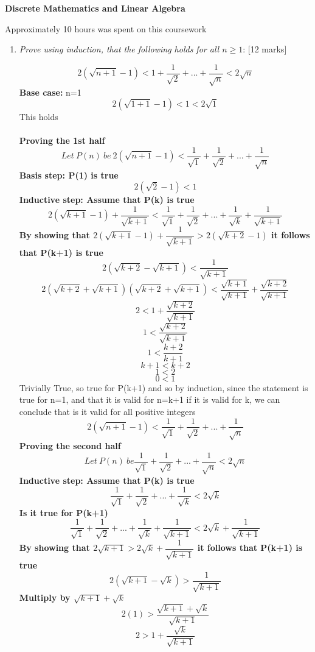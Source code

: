 \documentclass{article}[18pt]
\begin{document}
\begin{center}
\textbf{\Large Discrete Mathematics and Linear Algebra}
\end{center}
Approximately 10 hours was spent on this coursework
\begin{enumerate}
	\item \textit{Prove \textit{using induction}, that the following holds for all $n\geqslant 1$}:\hfill
[12 marks]

	$$2(\sqrt{n+1}-1)<1+\dfrac{1}{\sqrt{2}}+...+\dfrac{1}{\sqrt{n}}<2\sqrt{n}$$
	$ $\\
	\textbf{Base case:} n=1 
	$$2(\sqrt{1+1}-1)<1<2\sqrt{1}$$
	This holds\\
\\
\textbf{Proving the 1st half \cite{rosen}}\\
$$ Let \ P(n) \ be \  2(\sqrt{n+1}-1)<\dfrac{1}{\sqrt{1}}+\dfrac{1}{\sqrt{2}}+...+\dfrac{1}{\sqrt{n}}$$
\textbf{Basis step: P(1) is true}
$$2(\sqrt{2}-1)<1$$
\textbf{Inductive step: Assume that P(k) is true}
$$2(\sqrt{k+1}-1)+\dfrac{1}{\sqrt{k+1}}<\dfrac{1}{\sqrt{1}}+\dfrac{1}{\sqrt{2}}+...+\dfrac{1}{\sqrt{k}}+\dfrac{1}{\sqrt{k+1}}$$
\textbf{By showing that $2(\sqrt{k+1}-1)+\dfrac{1}{\sqrt{k+1}}>2(\sqrt{k+2}-1)$ it follows that P(k+1) is true}
$$2(\sqrt{k+2}-\sqrt{k+1})<\dfrac{1}{\sqrt{k+1}}$$
$$2(\sqrt{k+2}+\sqrt{k+1})(\sqrt{k+2}+\sqrt{k+1})<\dfrac{\sqrt{k+1}}{\sqrt{k+1}}+\dfrac{\sqrt{k+2}}{\sqrt{k+1}}$$
$$2<1+\dfrac{\sqrt{k+2}}{\sqrt{k+1}}$$
$$1<\dfrac{\sqrt{k+2}}{\sqrt{k+1}}$$
$$1<\dfrac{k+2}{k+1}$$
$$k+1<k+2$$
$$1<2$$
$$0<1$$
Trivially True, so true for P(k+1) and so by induction, since the statement is true for n=1, and that it is valid for n=k+1 if it is valid for k, we can conclude that is it valid for all positive integers \\
$$2(\sqrt{n+1}-1)<\dfrac{1}{\sqrt{1}}+\dfrac{1}{\sqrt{2}}+...+\dfrac{1}{\sqrt{n}}$$
\newpage
\textbf{Proving the second half}
$$Let \ P(n) \ be \dfrac{1}{\sqrt{1}}+\dfrac{1}{\sqrt{2}}+...+\dfrac{1}{\sqrt{n}}<2\sqrt{n}$$
\textbf{Inductive step: Assume that P(k) is true}
$$\dfrac{1}{\sqrt{1}}+\dfrac{1}{\sqrt{2}}+...+\dfrac{1}{\sqrt{k}}<2\sqrt{k}$$
\textbf{Is it true for P(k+1)}
$$\dfrac{1}{\sqrt{1}}+\dfrac{1}{\sqrt{2}}+...+\dfrac{1}{\sqrt{k}}+\dfrac{1}{\sqrt{k+1}}<2\sqrt{k}+\dfrac{1}{\sqrt{k+1}}$$
\textbf{By showing that $2\sqrt{k+1}>2\sqrt{k}+\dfrac{1}{\sqrt{k+1}}$ it follows that P(k+1) is true}	
$$2(\sqrt{k+1}-\sqrt{k})>\dfrac{1}{\sqrt{k+1}}$$
\textbf{Multiply by $\sqrt{k+1}+\sqrt{k}$}
$$2(1)>\dfrac{\sqrt{k+1}+\sqrt{k}}{\sqrt{k+1}}$$
$$2>1+\dfrac{\sqrt{k}}{\sqrt{k+1}}$$

\end{enumerate}
\end{document}
